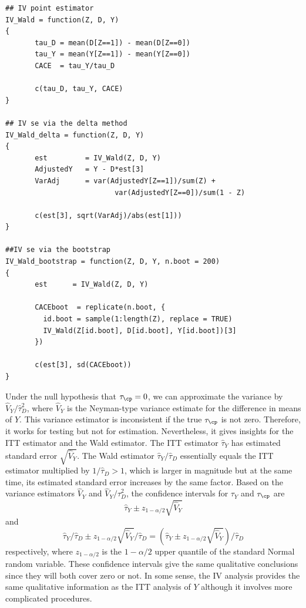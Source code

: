 \begin{lstlisting}
## IV point estimator
IV_Wald = function(Z, D, Y)
{
       tau_D = mean(D[Z==1]) - mean(D[Z==0])
       tau_Y = mean(Y[Z==1]) - mean(Y[Z==0])
       CACE  = tau_Y/tau_D
       
       c(tau_D, tau_Y, CACE)
}

## IV se via the delta method
IV_Wald_delta = function(Z, D, Y)
{
       est         = IV_Wald(Z, D, Y)
       AdjustedY   = Y - D*est[3]
       VarAdj      = var(AdjustedY[Z==1])/sum(Z) + 
                          var(AdjustedY[Z==0])/sum(1 - Z)
       
       c(est[3], sqrt(VarAdj)/abs(est[1]))
}

##IV se via the bootstrap
IV_Wald_bootstrap = function(Z, D, Y, n.boot = 200)
{
       est      = IV_Wald(Z, D, Y)
       
       CACEboot  = replicate(n.boot, {
         id.boot = sample(1:length(Z), replace = TRUE)
         IV_Wald(Z[id.boot], D[id.boot], Y[id.boot])[3]
       })
       
       c(est[3], sd(CACEboot))
}
\end{lstlisting}


Under the null hypothesis that $\tau_\cp = 0$, we can approximate the variance by $\hat{V}_Y /  \hat{\tau}_D ^2$, where $\hat{V}_Y$ is the Neyman-type variance estimate for the difference in means of $Y$. This variance estimator is inconsistent if the true $\tau_\cp$ is not zero. Therefore, it works for testing but not for estimation. Nevertheless, it gives insights for the ITT estimator and the Wald estimator. The ITT estimator $\hat{\tau}_Y$ has estimated standard error  $\sqrt{ \hat{V}_Y}$. The Wald estimator $ \hat{\tau}_Y / \hat{\tau}_D$ essentially equals the ITT estimator multiplied by $1/\hat{\tau}_D > 1$, which is larger in magnitude but at the same time, its estimated standard error increases by the same factor. 
Based on the variance estimators $\hat{V}_Y $ and $\hat{V}_Y /  \hat{\tau}_D ^2$, the confidence intervals for $\tau_Y$ and $\tau_\cp$ are
$$
\hat{\tau}_Y \pm z_{1-\alpha/2} \sqrt{ \hat{V}_Y}
$$
and
$$
\hat{\tau}_Y  / \hat{\tau}_D \pm z_{1-\alpha/2} \sqrt{ \hat{V}_Y}  / \hat{\tau}_D
= 
\left( \hat{\tau}_Y \pm z_{1-\alpha/2} \sqrt{ \hat{V}_Y}  \right) / \hat{\tau}_D 
$$
respectively, where $z_{1-\alpha/2}$ is the $1-\alpha/2$ upper quantile of the standard Normal random variable. 
These confidence intervals give the same qualitative conclusions since they will both cover zero or not. In some sense, the IV analysis provides the same qualitative information as the ITT analysis of $Y$ although it involves more complicated procedures.  




